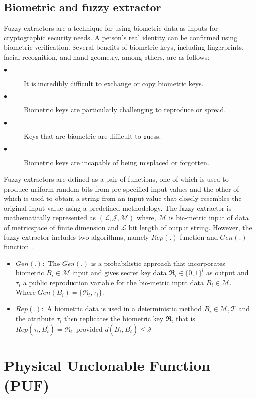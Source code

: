 \documentclass[3p,times,onecolumn]{elsarticle}
\begin{document}
\subsection{\textbf{Biometric and fuzzy extractor }}
Fuzzy extractors are a technique for using biometric data as inputs for cryptographic security needs.
A person's real identity can be confirmed using biometric verification. Several benefits of biometric keys, including fingerprints, facial recognition, and hand geometry, among others, are as follows:
\begin{description}
\item[$\bullet$] It is incredibly difficult to exchange or copy biometric keys.
\item[$\bullet$] Biometric keys are particularly challenging to reproduce or spread.
\item[$\bullet$] Keys that are biometric are difficult to guess.
\item[$\bullet$] Biometric keys are incapable of being misplaced or forgotten.
\end{description}
Fuzzy extractors are defined as a pair of functions, one of which is used to produce uniform random bits from pre-specified input values and the other of which is used to obtain a string from an input value that closely resembles the original input value using a predefined methodology. The fuzzy extractor is mathematically represented as $(\mathcal{L,J,M})$ where, $\mathcal{M}$ is bio-metric input of data of metricspace of finite dimension and $\mathcal{L}$ bit length of output string. However, the fuzzy extractor includes two algorithms, namely $Rep(.)$ function and $Gen(.)$ function \cite{u23,L7}.
\begin{itemize}
    \item {$Gen(.):$} The $Gen(.)$ is a probabilistic approach that incorporates biometric ${B_{i}}\in\mathcal{M}$ input and gives secret key data $\Re_{i}\in \{0,1\}^{l}$ as output and $\tau_{i}$ a public reproduction variable for the bio-metric input data ${B_{i}}\in\mathcal{M}$. Where $Gen(B_{i})=\{\Re_{i},\tau_{i}\}$.
    \item $Rep(.):$ A biometric data is used in a deterministic method $B_{i}^{'}\in \mathcal{M},\mathcal{T}$ and the attribute $\tau_{i}$ then replicates the biometric key $\Re$, that is $Rep(\tau_{i},B_{i}^{'})=\Re_{i}$, provided $d(B_{i},B_{i}^{'})\leq \mathcal{J}$
\end{itemize}



\section{\textbf{Physical Unclonable Function (PUF)  }}
\end{document}
